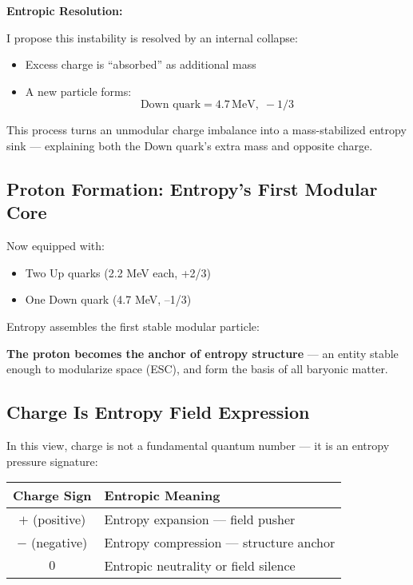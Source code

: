 \documentclass[12pt]{article}
\begin{document}
\textbf{Entropic Resolution:}

I propose this instability is resolved by an internal collapse:
\begin{itemize}
    \item Excess charge is ``absorbed'' as additional mass
    \item A new particle forms:
\[
\text{Down quark} = 4.7 \, \text{MeV},\; -1/3
\]
\end{itemize}

This process turns an unmodular charge imbalance into a mass-stabilized entropy sink — explaining both the Down quark’s extra mass and opposite charge.

\subsection{Proton Formation: Entropy’s First Modular Core}

Now equipped with:
\begin{itemize}
    \item Two Up quarks (2.2 MeV each, +2/3)
    \item One Down quark (4.7 MeV, –1/3)
\end{itemize}

Entropy assembles the first stable modular particle:

\noindent
\textbf{The proton becomes the anchor of entropy structure} — an entity stable enough to modularize space (ESC), and form the basis of all baryonic matter.

\subsection{Charge Is Entropy Field Expression}

In this view, charge is not a fundamental quantum number — it is an entropy pressure signature:

\vspace{0.5em}
\begin{center}
\begin{tabular}{|c|p{10cm}|}
\hline
\textbf{Charge Sign} & \textbf{Entropic Meaning} \\
\hline
$+$ (positive) & Entropy expansion — field pusher \\
\hline
$-$ (negative) & Entropy compression — structure anchor \\
\hline
$0$ & Entropic neutrality or field silence \\
\hline
\end{tabular}
\end{center}
\vspace{0.5em}
\end{document}
